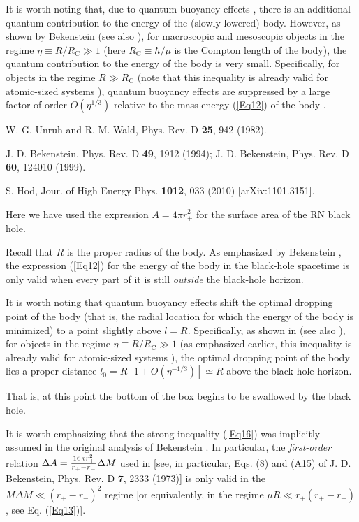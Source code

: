 \documentclass[12pt,preprintnumbers,amsmath,amssymbm,prd]{revtex4-1}
\begin{document}
\begin{thebibliography}{99}
 It is worth noting that, due to quantum buoyancy effects
\cite{UW}, there is an additional quantum contribution to the energy
of the (slowly lowered) body. However, as shown by Bekenstein
\cite{Bekw} (see also \cite{HodD}), for macroscopic and mesoscopic
objects in the regime $\eta\equiv R/R_{\text{C}}\gg1$ (here
$R_{\text{C}}\equiv\hbar/\mu$ is the Compton length of the body),
the quantum contribution to the energy of the body is very small.
Specifically, for objects in the regime $R\gg R_{\text{C}}$ (note
that this inequality is already valid for atomic-sized systems
\cite{Bekw}), quantum buoyancy effects are suppressed by a large
factor of order $O(\eta^{1/3})$ relative to the mass-energy
(\ref{Eq12}) of the body \cite{Bekw}.

 W. G. Unruh and R. M. Wald, Phys. Rev. D {\bf 25}, 942
(1982).

 J. D. Bekenstein, Phys. Rev. D {\bf 49}, 1912 (1994);
J. D. Bekenstein, Phys. Rev. D {\bf 60}, 124010 (1999).

 S. Hod, Jour. of High Energy Phys. {\bf 1012}, 033
(2010) [arXiv:1101.3151].

 Here we have used the expression $A=4\pi r^2_+$ for
the surface area of the RN black hole.

 Recall that $R$ is the proper radius of the body.
As emphasized by Bekenstein \cite{Bek73}, the expression
(\ref{Eq12}) for the energy of the body in the black-hole spacetime
is only valid when every part of it is still {\it outside} the
black-hole horizon.

 It is worth noting that quantum buoyancy effects
\cite{UW} shift the optimal dropping point of the body (that is, the
radial location for which the energy of the body is minimized) to a
point slightly above $l=R$. Specifically, as shown in \cite{Bekw}
(see also \cite{HodD}), for objects in the regime $\eta\equiv
R/R_{\text{C}}\gg1$ (as emphasized earlier, this inequality is
already valid for atomic-sized systems \cite{Bekw}), the optimal
dropping point of the body lies a proper distance
$l_0=R[1+O(\eta^{-1/3})]\simeq R$ above the black-hole horizon.

 That is, at this point the bottom of the box begins to be swallowed by the
black hole.

 It is worth emphasizing that the strong inequality
(\ref{Eq16}) was implicitly assumed in the original analysis of
Bekenstein \cite{Bek73}. In particular, the {\it first-order}
relation $\Delta A={{16\pi r^2_+}\over{r_+-r_-}}\Delta M$ used in
\cite{Bek73} [see, in particular, Eqs. (8) and (A15) of J. D.
Bekenstein, Phys. Rev. D {\bf 7}, 2333 (1973)] is only valid in the
$M\Delta M\ll (r_+-r_-)^2$ regime [or equivalently, in the regime
$\mu R\ll r_+(r_+-r_-)$, see Eq. (\ref{Eq13})].


\end{thebibliography}
\end{document}
